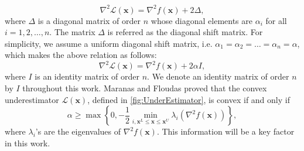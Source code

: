 \documentclass{elsarticle}
\numberwithin{equation}{section}
\begin{document}
\begin{equation}
    \nabla^2\mathcal{L}(\mathbf{x}) = \nabla^2f(\mathbf{x}) + 2\Delta,
    \label{fig:undrest}
\end{equation}
where $\Delta$ is a diagonal matrix of order $n$ whose diagonal elements are $\alpha_i$ for all $i=1,2,\ldots,n$. The matrix $\Delta$ is referred as the diagonal shift matrix. For simplicity, we assume a uniform diagonal shift matrix, i.e. $\alpha_1=\alpha_2=\dots=\alpha_n=\alpha$, which makes the above relation as follows:
\begin{equation}
    \nabla^2\mathcal{L}(\mathbf{x}) = \nabla^2f(\mathbf{x}) + 2\alpha {I},
    \label{eq:commonalpha}    
\end{equation}
where ${I}$ is an identity matrix of order $n$. We denote an identity matrix of order $n$ by $I$ throughout this work. Maranas and Floudas \cite{androulakis1995alphabb} proved that the convex underestimator $\mathcal{L}(\mathbf{x})$, defined in \eqref{fig:UnderEstimator}, is convex if and only if
\begin{equation}
    \alpha \geq \max\left\{{0, -\frac{1}{2}\min_{i,\mathbf{x}^L\leq \mathbf{x} \leq \mathbf{x}^U}\lambda_i(\nabla^2f(\mathbf{x}))}\right\},
    \label{eq:alpha}
\end{equation}
where  $\lambda_i$'s are the eigenvalues of $\nabla^2f(\mathbf{x})$. This information will be a key factor in this work.
\end{document}
